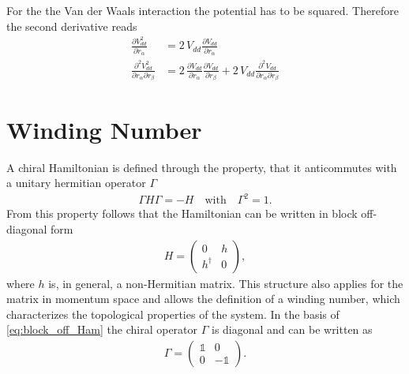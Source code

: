 For the the Van der Waals interaction the potential has to be squared. Therefore the second derivative reads
\begin{align*}
    \frac{\partial V_{dd}^2}{\partial r_\alpha} &= 2\,V_{dd} \frac{\partial V_{dd}}{\partial r_\alpha}\\
    \frac{\partial^2 V_{dd}^2}{\partial r_\alpha \partial r_\beta} &= 2\,\frac{\partial V_{dd}}{\partial r_\alpha}\frac{\partial V_{dd}}{\partial r_\beta} + 2\,V_{dd}\frac{\partial^2 V_{dd}}{\partial r_\alpha \partial r_\beta}
\end{align*}





\section*{Winding Number}
A chiral Hamiltonian is defined through the property, that it anticommutes with a unitary hermitian operator $\Gamma$
\begin{align}
    \Gamma H \Gamma = -H \quad \text{with} \quad \Gamma^2 = 1.
\end{align}
From this property follows that the Hamiltonian can be written in block off-diagonal form
\begin{align}\label{eq:block_off_Ham}
    H = \begin{pmatrix}
        0 & h \\
        h^\dagger & 0
    \end{pmatrix},
\end{align}
where $h$ is, in general, a non-Hermitian matrix. This structure also applies for the matrix in momentum space and allows the definition of a winding number, which characterizes the topological properties of the system. In the basis of \eqref{eq:block_off_Ham} the chiral operator $\Gamma$ is diagonal and can be written as
\begin{align}
    \Gamma = \begin{pmatrix}   
        \mathbb{1} & 0 \\
            0 & -\mathbb{1} 
    \end{pmatrix}.
\end{align}         

